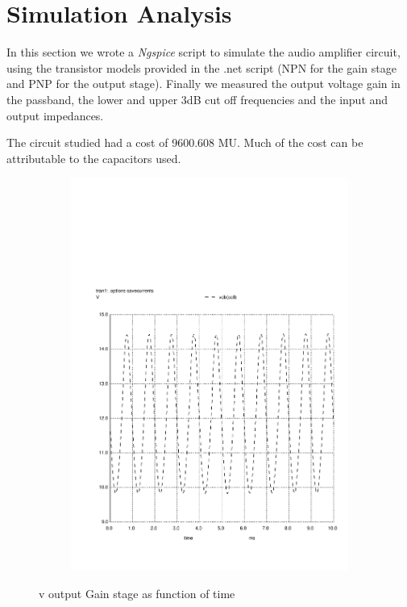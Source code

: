 \section{Simulation Analysis}
\label{sec:simulation}

In this section we wrote a \textit{Ngspice} script to simulate the audio
amplifier circuit, using the transistor models provided in the .net script
(NPN for the gain stage and PNP for the output stage).
Finally we measured the output voltage gain in the passband,
the lower and upper 3dB cut off frequencies and the input and output
impedances.


The circuit studied had a cost of 9600.608 MU. Much of the cost can be 
attributable to the capacitors used. 


\begin{figure}[h]
    \centering
    \begin{subfigure}{0.23\textwidth}
        \includegraphics[width=\linewidth, clip]{vo1.pdf}
        \label{fig:output1}
    \end{subfigure}
    \caption{v output Gain stage as function of time}
\end{figure}


